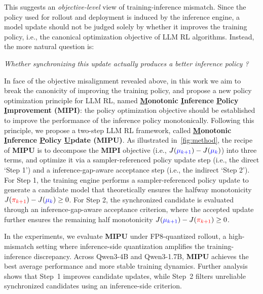 This suggests an \textit{objective-level} view of training-inference mismatch.
Since the policy used for rollout and deployment is induced by the inference engine, a model update should not be judged solely by whether it improves the training policy, i.e., the canonical optimization objective of LLM RL algorithms.
Instead, the more natural question is:
\vspace{-0.1cm}
\begin{center}
\textit{Whether synchronizing this update actually produces a better inference policy ?}
\end{center}
\vspace{-0.1cm}
In face of the objective misalignment revealed above, in this work we aim to break the canonicity of improving the training policy, and propose a new policy optimization principle for LLM RL, named \textbf{\underline{M}onotonic \underline{I}nference \underline{P}olicy \underline{I}mprovement ({MIPI})}: the policy optimization objective should be established to improve the performance of the inference policy monotonically.
Following this principle, we propose a two-step LLM RL framework, called \textbf{\underline{M}onotonic \underline{I}nference \underline{P}olicy \underline{U}pdate (MIPU)}.
As illustrated in~\autoref{fig:method}, the recipe of \textbf{MIPU} is to decompose the \textbf{MIPI} objective (i.e., $J(\textcolor{blue}{\mu_{k+1}})-J(\textcolor{blue}{\mu_k})$) into three terms, and optimize it via a sampler-referenced policy
update step (i.e., the direct `Step 1') and a inference-gap-aware acceptance step (i.e., the indirect `Step 2').
For Step 1, the training engine performs a sampler-referenced policy update to generate a candidate model that theoretically ensures the halfway monotonicity $J(\textcolor{red}{\pi_{k+1}})-J(\textcolor{blue}{\mu_k}) \ge 0$.
For Step 2, the synchronized candidate is evaluated through an inference-gap-aware acceptance criterion, where the accepted update further ensures the remaining half monotonicity $J(\textcolor{blue}{\mu_{k+1}}) -J(\textcolor{red}{\pi_{k+1}}) \ge 0$.

In the experiments, we evaluate \textbf{MIPU} under FP8-quantized rollout, a high-mismatch setting where inference-side quantization amplifies the training-inference discrepancy. 
Across Qwen3-4B and Qwen3-1.7B, \textbf{MIPU} achieves the best average performance and more stable training dynamics. 
Further analysis shows that Step~1 improves candidate updates, while Step~2 filters unreliable synchronized candidates using an inference-side criterion.

